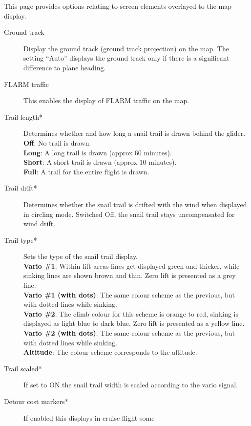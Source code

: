 This page provides options relating to screen elements overlayed to the map display.

\begin{description}
\item[Ground track]  Display the ground track (ground track projection) on the map.
  The setting ``Auto'' displays the ground track only if there is a significant
  difference to plane heading.
\item[FLARM traffic]  \label{conf:flarm-on-map} This enables the display of FLARM 
  traffic on the map.
\item[Trail length*] \label{conf:snailtrail} Determines whether and how long a
  snail trail is drawn behind the glider. \\
  {\bf Off}: No trail is drawn. \\
  {\bf Long}: A long trail is drawn (approx 60 minutes). \\
  {\bf Short}: A short trail is drawn (approx 10 minutes). \\
  {\bf Full}: A trail for the entire flight is drawn.
\item[Trail drift*] \label{conf:traildrift} Determines whether the
  snail trail is drifted with the wind when displayed in circling mode.  Switched Off,
  the snail trail stays uncompensated for wind drift.
\item[Trail type*] \label{conf:snailtype} Sets the type of the snail trail display. \\
  {\bf Vario \#1}: Within lift areas lines get displayed green and
  thicker, while sinking lines are shown brown and thin.  Zero lift
  is presented as a grey line. \\
  {\bf Vario \#1 (with dots)}: The same colour scheme as the previous, but with dotted 
  lines while sinking. \\
  {\bf Vario \#2}: The climb colour for this scheme is orange to red, sinking is
  displayed as light blue to dark blue. Zero lift is presented as a yellow line. \\
  {\bf Vario \#2 (with dots)}: The same colour scheme as the previous, but with dotted 
  lines while sinking. \\
  {\bf Altitude}: The colour scheme corresponds to the altitude.
\item[Trail scaled*] \label{conf:trailscaled} If set to ON the snail trail 
  width is scaled according to the vario signal.
\item[Detour cost markers*]  If enabled this displays in cruise flight some

\end{description}
